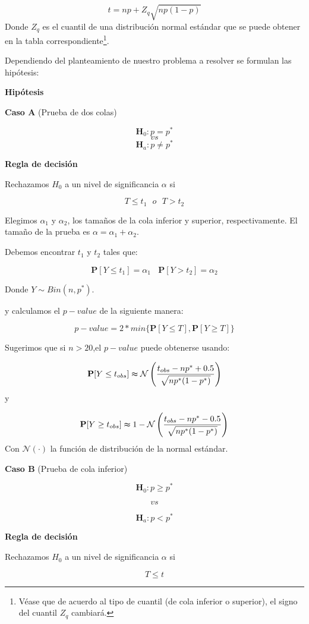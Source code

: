 \documentclass[
  a4paper,
  oneside,
  openany]{book}
\begin{document}
\[t=np+Z_{q}\sqrt{np(1-p)}\]
Donde \(Z_{q}\) es el cuantil de una distribución normal estándar que se puede obtener en la tabla correspondiente\footnote{Véase que de acuerdo al tipo de cuantil (de cola inferior o superior), el signo del cuantil \(Z_q\) cambiará.}.

Dependiendo del planteamiento de nuestro problema a resolver se formulan las hipótesis:

\textbf{Hipótesis}

\textbf{Caso A} (Prueba de dos colas)

\[\textbf{H}_0: p = p^*\]
\[vs\]
\[\textbf{H}_a: p \neq p^*\]

\textbf{Regla de decisión}

Rechazamos \(H_0\) a un nivel de significancia \(\alpha\) si

\[T \leq t_{1} \ \ \ o \ \ \ T > t_{2}\]

Elegimos \(\alpha_{1}\) y \(\alpha_{2}\), los tamaños de la cola inferior y superior, respectivamente. El tamaño de la prueba es \(\alpha=\alpha_{1}+\alpha_{2}\).

Debemos encontrar \(t_{1}\) y \(t_{2}\) tales que:

\[\mathbf{P}[Y \leq t_{1}]=\alpha_{1} \ \ \ \ \mathbf{P}[Y > t_{2}]=\alpha_{2}\]

Donde \(Y \sim Bin (n,p^*)\).

y calculamos el \(p-value\) de la siguiente manera:

\[p-value=2*min \{ \mathbf{P}[Y\leq T],\mathbf{P}[Y \geq T] \}\]

Sugerimos que si \(n > 20\),el \(p-value\) puede obtenerse usando:

\[\mathbf{P}[Y\leq t_{obs}] \thickapprox \mathcal{N} \left(\frac{t_{obs}-np^*+0.5}{\sqrt{np^*(1-p^*)}}\right)\]
y

\[\mathbf{P}[Y\geq t_{obs}] \thickapprox 1-\mathcal{N} \left(\frac{t_{obs}-np^*-0.5}{\sqrt{np^*(1-p^*)}}\right)\]
Con \(\mathcal{N}(\cdot)\) la función de distribución de la normal estándar.

\textbf{Caso B} (Prueba de cola inferior)

\[\textbf{H}_0: p  \geq p^*\]

\[vs\]

\[\textbf{H}_a: p <p^*\]

\textbf{Regla de decisión}

Rechazamos \(H_0\) a un nivel de significancia \(\alpha\) si

\[T \leq t\]
\end{document}
